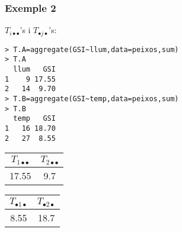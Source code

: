 \documentclass[12pt,t]{beamer}
\theoremstyle{plain}
\theoremstyle{definition}
\begin{document}
%
%
%
%


\begin{frame}[fragile]
\frametitle{Exemple 2}
\vspace*{-2ex}

$T_{i\bullet\bullet}$'s i $T_{\bullet j\bullet}$'s:
\vspace*{-1ex}

\begin{verbatim}
> T.A=aggregate(GSI~llum,data=peixos,sum)
> T.A
  llum   GSI
1    9 17.55
2   14  9.70
> T.B=aggregate(GSI~temp,data=peixos,sum)
> T.B
  temp   GSI
1   16 18.70
2   27  8.55
\end{verbatim}
\begin{center}
\begin{tabular}{cc}
$T_{1\bullet\bullet}$ & $T_{2\bullet\bullet}$ \\ \hline
17.55 &  9.7
\end{tabular}
\qquad\qquad
\begin{tabular}{cc}
$T_{\bullet 1\bullet}$ & $T_{\bullet 2\bullet}$ \\ \hline
8.55 & 18.7
\end{tabular}
\end{center}

\end{frame}
\end{document}
